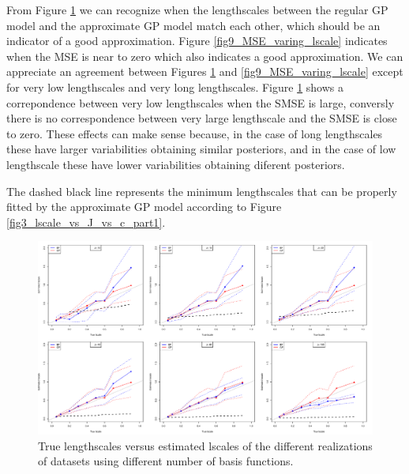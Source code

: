 \documentclass[]{interact}
\theoremstyle{plain}%
\theoremstyle{definition}
\theoremstyle{remark}
\begin{document}
From Figure \ref{fig8_Tlscale_vs_Elscale} we can recognize when the lengthscales between the regular GP model and the approximate GP model match each other, which should be an indicator of a good approximation. Figure \ref{fig9_MSE_varing_lscale} indicates when the MSE is near to zero which also indicates a good approximation. We can appreciate an agreement between Figures \ref{fig8_Tlscale_vs_Elscale} and \ref{fig9_MSE_varing_lscale} except for very low lengthscales and very long lengthscales. Figure \ref{fig8_Tlscale_vs_Elscale} shows a correpondence between very low lengthscales when the SMSE is large, conversly there is no correspondence between very large lengthscale and the SMSE is close to zero. These effects can make sense because, in the case of long lengthscales these have larger variabilities obtaining  similar posteriors, and in the case of low lengthscale these have lower variabilities obtaining diferent posteriors.

The dashed black line represents the minimum lengthscales that can be properly fitted by the approximate GP model according to Figure \ref{fig3_lscale_vs_J_vs_c_part1}.


\begin{figure}[H]
\centering
\includegraphics[scale=0.4]{fig8_Tlscale_vs_Elscale.pdf}
\caption{True lengthscales versus estimated lscales of the different realizations of datasets using different number of basis functions. }
  \label{fig8_Tlscale_vs_Elscale}
\end{figure}
\end{document}
